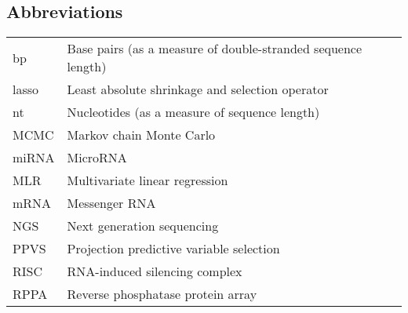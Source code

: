 \documentclass[english,12pt,a4paper,pdftex,elec,utf8]{aaltothesis}
\begin{document}

\subsection*{Abbreviations}

\begin{tabular}{ll}
bp          & Base pairs (as a measure of double-stranded sequence length) \\
lasso       & Least absolute shrinkage and selection operator \\
nt          & Nucleotides (as a measure of sequence length) \\
MCMC        & Markov chain Monte Carlo \\
miRNA       & MicroRNA \\
MLR         & Multivariate linear regression \\
mRNA        & Messenger RNA \\
NGS         & Next generation sequencing \\
PPVS        & Projection predictive variable selection \\
RISC        & RNA-induced silencing complex \\
RPPA        & Reverse phosphatase protein array
\end{tabular}


\cleardoublepage
{}
\setcounter{page}{1}
\storeinipagenumber
\end{document}

